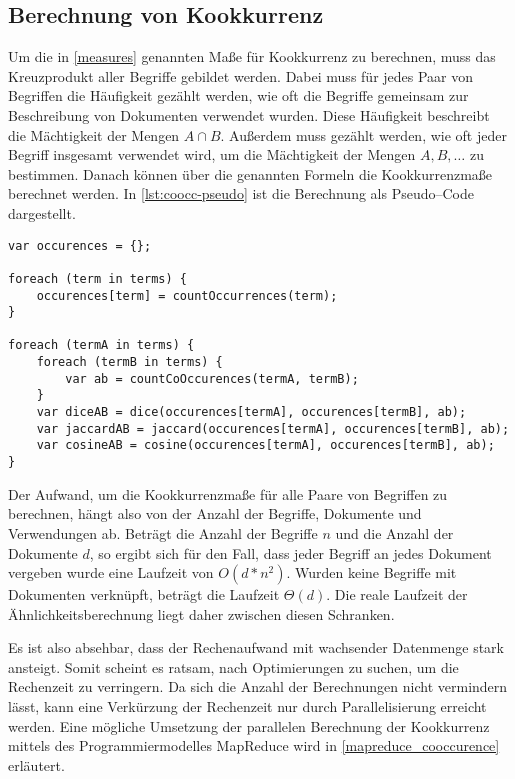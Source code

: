 \subsection{Berechnung von Kookkurrenz}

Um die in \cref{measures} genannten Maße für Kookkurrenz zu berechnen, muss das Kreuzprodukt aller Begriffe gebildet werden. Dabei muss für jedes Paar von Begriffen die Häufigkeit gezählt werden, wie oft die Begriffe gemeinsam zur Beschreibung von Dokumenten verwendet wurden. Diese Häufigkeit beschreibt die Mächtigkeit der Mengen \(A \cap B\). Außerdem muss gezählt werden, wie oft jeder Begriff insgesamt verwendet wird, um die Mächtigkeit der Mengen \(A, B, \dots\) zu bestimmen. Danach können über die genannten Formeln die Kookkurrenzmaße berechnet werden. In \cref{lst:coocc-pseudo} ist die Berechnung als Pseudo--Code dargestellt.

\begin{lstlisting}[language=pseudo, label={lst:coocc-pseudo}, caption={Kookkurrenzberechnung}]
var occurences = {};

foreach (term in terms) {
    occurences[term] = countOccurrences(term);
}

foreach (termA in terms) {
    foreach (termB in terms) {
        var ab = countCoOccurences(termA, termB);
    }
    var diceAB = dice(occurences[termA], occurences[termB], ab);
    var jaccardAB = jaccard(occurences[termA], occurences[termB], ab);
    var cosineAB = cosine(occurences[termA], occurences[termB], ab);
}
\end{lstlisting}

Der Aufwand, um die Kookkurrenzmaße für alle Paare von Begriffen zu berechnen, hängt also von der Anzahl der Begriffe, Dokumente und Verwendungen ab. Beträgt die Anzahl der Begriffe \(n\) und die Anzahl der Dokumente \(d\), so ergibt sich für den Fall, dass jeder Begriff an jedes Dokument vergeben wurde eine Laufzeit von \(O(d*n^2)\). Wurden keine Begriffe mit Dokumenten verknüpft, beträgt die Laufzeit \(\Theta(d)\). Die reale Laufzeit der Ähnlichkeitsberechnung liegt daher zwischen diesen Schranken.

Es ist also absehbar, dass der Rechenaufwand mit wachsender Datenmenge stark ansteigt. Somit scheint es ratsam, nach Optimierungen zu suchen, um die Rechenzeit zu verringern. Da sich die Anzahl der Berechnungen nicht vermindern lässt, kann eine Verkürzung der Rechenzeit nur durch Parallelisierung erreicht werden. Eine mögliche Umsetzung der parallelen Berechnung der Kookkurrenz mittels des Programmiermodelles  MapReduce wird in \cref{mapreduce_cooccurence} erläutert.

